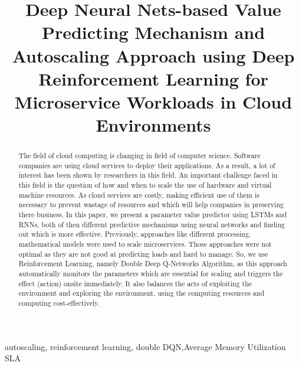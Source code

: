 \documentclass[conference]{IEEEtran}
\begin{document}
\title{Deep Neural Nets-based Value Predicting Mechanism and Autoscaling Approach using Deep Reinforcement Learning for Microservice Workloads in Cloud Environments\\
}

\author{
}

\maketitle

\begin{abstract}
The field of cloud computing is changing in field of computer science. Software companies are using cloud services to deploy their applications. As a result, a lot of interest has been shown by researchers in this field. An important challenge faced in this field is the question of how and when to scale the use of hardware and virtual machine resources. As cloud services are costly, making efficient use of them is necessary to prevent wastage of resources and which will help companies in preserving there business. In this paper, we present a parameter value predictor using LSTMs and RNNs, both of then different predictive mechanisms using neural networks and finding out which is more effective. Previously, approaches like different processing, mathematical models were used to scale microservices. Those approaches were not optimal as they are not good at predicting loads and hard to manage. So, we use Reinforcement Learning, namely Double Deep Q-Networks Algorithm, as this approach automatically monitors the parameters which are essential for scaling and triggers the effect (action) onsite immediately. It also balances the acts of exploiting the environment and exploring the environment, using the computing resources and computing cost-effectively.
\end{abstract}

\begin{IEEEkeywords}
autoscaling, reinforcement learning, double DQN,Average Memory Utilization SLA
\end{IEEEkeywords}
\end{document}
